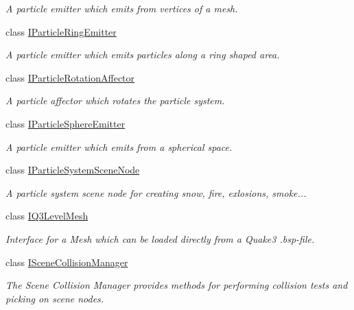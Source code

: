 \begin{DoxyCompactItemize}
\begin{DoxyCompactList}\small\item\em A particle emitter which emits from vertices of a mesh. \end{DoxyCompactList}\item 
class \hyperlink{classirr_1_1scene_1_1IParticleRingEmitter}{I\+Particle\+Ring\+Emitter}
\begin{DoxyCompactList}\small\item\em A particle emitter which emits particles along a ring shaped area. \end{DoxyCompactList}\item 
class \hyperlink{classirr_1_1scene_1_1IParticleRotationAffector}{I\+Particle\+Rotation\+Affector}
\begin{DoxyCompactList}\small\item\em A particle affector which rotates the particle system. \end{DoxyCompactList}\item 
class \hyperlink{classirr_1_1scene_1_1IParticleSphereEmitter}{I\+Particle\+Sphere\+Emitter}
\begin{DoxyCompactList}\small\item\em A particle emitter which emits from a spherical space. \end{DoxyCompactList}\item 
class \hyperlink{classirr_1_1scene_1_1IParticleSystemSceneNode}{I\+Particle\+System\+Scene\+Node}
\begin{DoxyCompactList}\small\item\em A particle system scene node for creating snow, fire, exlosions, smoke... \end{DoxyCompactList}\item 
class \hyperlink{classirr_1_1scene_1_1IQ3LevelMesh}{I\+Q3\+Level\+Mesh}
\begin{DoxyCompactList}\small\item\em Interface for a Mesh which can be loaded directly from a Quake3 .bsp-\/file. \end{DoxyCompactList}\item 
class \hyperlink{classirr_1_1scene_1_1ISceneCollisionManager}{I\+Scene\+Collision\+Manager}
\begin{DoxyCompactList}\small\item\em The Scene Collision Manager provides methods for performing collision tests and picking on scene nodes. \end{DoxyCompactList}\item 

\end{DoxyCompactItemize}
